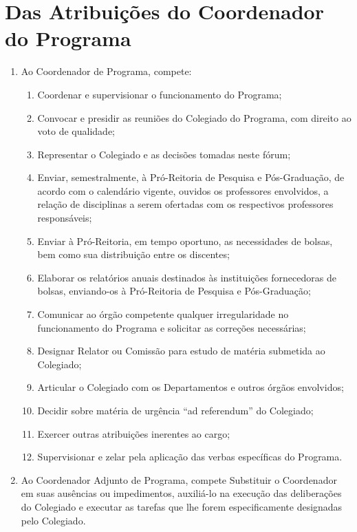 \documentclass{article}
\begin{document}
\section{Das Atribuições do Coordenador do Programa}
\begin{enumerate}
	\item Ao Coordenador de Programa, compete:
	\begin{enumerate}[label=\Roman*]
		\item Coordenar e supervisionar o funcionamento do Programa;
		\item Convocar e presidir as reuniões do Colegiado do Programa, com direito ao voto de qualidade;
		\item Representar o Colegiado e as decisões tomadas neste fórum;
		\item Enviar, semestralmente, à Pró-Reitoria de Pesquisa e Pós-Graduação, de acordo com o calendário vigente, ouvidos os professores envolvidos, a relação de disciplinas a serem ofertadas com os respectivos professores responsáveis;
		\item Enviar à Pró-Reitoria, em tempo oportuno, as necessidades de bolsas, bem como sua distribuição entre os discentes;
		\item Elaborar os relatórios anuais destinados às instituições fornecedoras de bolsas, enviando-os à Pró-Reitoria de Pesquisa e Pós-Graduação;
		\item Comunicar ao órgão competente qualquer irregularidade no funcionamento do Programa e solicitar as correções necessárias;
		\item Designar Relator ou Comissão para estudo de matéria submetida ao Colegiado;
		\item Articular o Colegiado com os Departamentos e outros órgãos envolvidos;
		\item Decidir sobre matéria de urgência ``ad referendum'' do Colegiado;
		\item Exercer outras atribuições inerentes ao cargo;
		\item Supervisionar e zelar pela aplicação das verbas específicas do Programa.
	\end{enumerate}
	\item Ao Coordenador Adjunto de Programa, compete Substituir o Coordenador em suas ausências ou impedimentos, auxiliá-lo na execução das deliberações do Colegiado e executar as tarefas que lhe forem especificamente designadas pelo Colegiado.
\end{enumerate}
\end{document}
